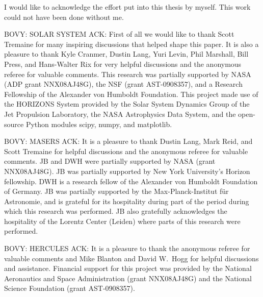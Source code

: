 %
I would like to acknowledge the effort put into this thesis by
myself. This work could not have been done without me.


BOVY: SOLAR SYSTEM ACK: First of all we would like to thank Scott
Tremaine for many inspiring discussions that helped shape this
paper. It is also a pleasure to thank Kyle Cranmer, Dustin Lang, Yuri
Levin, Phil Marshall, Bill Press, and Hans-Walter Rix for very helpful
discussions and the anonymous referee for valuable comments. This
research was partially supported by NASA (ADP grant NNX08AJ48G), the
NSF (grant AST-0908357), and a Research Fellowship of the Alexander
von Humboldt Foundation. This project made use of the HORIZONS System
provided by the Solar System Dynamics Group of the Jet Propulsion
Laboratory, the NASA Astrophysics Data System, and the open-source
Python modules scipy, numpy, and matplotlib.

BOVY: MASERS ACK: It is a pleasure to thank Dustin Lang, Mark Reid,
and Scott Tremaine for helpful discussions and the anonymous referee
for valuable comments. JB and DWH were partially supported by NASA
(grant NNX08AJ48G). JB was partially supported by New York
University's Horizon fellowship. DWH is a research fellow of the
Alexander von Humboldt Foundation of Germany. JB was partially
supported by the Max-Planck-Institut f\"ur Astronomie, and is grateful
for its hospitality during part of the period during which this
research was performed. JB also gratefully acknowledges the
hospitality of the Lorentz Center (Leiden) where parts of this
research were performed.

BOVY: HERCULES ACK: It is a pleasure to thank the anonymous referee
for valuable comments and Mike Blanton and David W.~Hogg for helpful
discussions and assistance.  Financial support for this project was
provided by the National Aeronautics and Space Administration (grant
NNX08AJ48G) and the National Science Foundation (grant AST-0908357).



